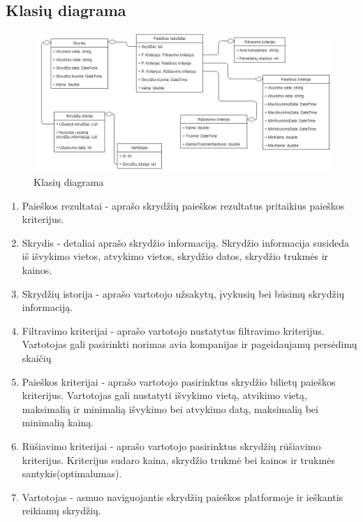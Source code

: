 \documentclass{VUMIFPSkursinis}
\begin{document}
            \subsection{Klasių diagrama}
                \begin{figure}[H]
                    \centering
                    \includegraphics[scale=0.5]{img/class_diagram}
                    \caption{Klasių diagrama}
                    \label{klasių diagrama}
                \end{figure}
                \begin{enumerate}[label=\textbf{E\arabic*}.]
                    \item Paieškos rezultatai - aprašo skrydžių paieškos rezultatus pritaikius paieškos kriterijus.
                    \item Skrydis - detaliai aprašo skrydžio informaciją. Skrydžio informacija susideda iš išvykimo vietos, atvykimo vietos, skrydžio datos, skrydžio trukmės ir kainos.
                    \item Skrydžių istorija - aprašo vartotojo užsakytų, įvykusių bei būsimų skrydžių informaciją.
                    \item Filtravimo kriterijai - aprašo vartotojo nustatytus filtravimo kriterijus. Vartotojas gali pasirinkti norimas avia kompanijas ir pageidaujamų persėdimų skaičių
                    \item Paieškos kriterijai - aprašo vartotojo pasirinktus skrydžio bilietų paieškos kriterijus. Vartotojas gali nustatyti išvykimo vietą, atvikimo vietą, maksimalią ir minimalią išvykimo bei atvykimo datą, maksimalią bei minimalią kainą.
                    \item Rūšiavimo kriterijai - aprašo vartotojo pasirinktus skrydžių rūšiavimo kriterijus. Kriterijus sudaro kaina, skrydžio trukmė bei kainos ir trukmės santykis(optimalumas).
                    \item Vartotojas - asmuo naviguojantis skrydžių paieškos platformoje ir ieškantis reikiamų skrydžių.
                \end{enumerate}
    
\end{document}
